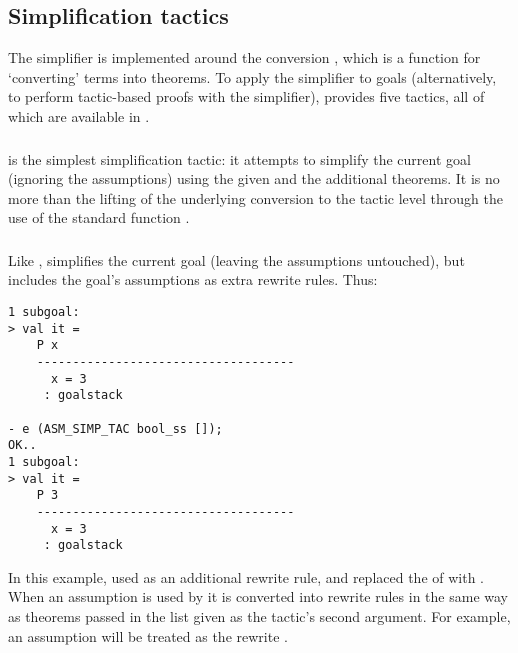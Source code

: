 \subsection{Simplification tactics}
\label{sec:simplification-tactics}

The simplifier is implemented around the conversion ,
which is a function for `converting' terms into theorems.  To apply
the simplifier to goals (alternatively, to perform tactic-based proofs
with the simplifier), \HOL{} provides five tactics, all of which are
available in .

\subsubsection{}

 is the simplest simplification tactic: it attempts to
simplify the current goal (ignoring the assumptions) using the given
\simpset{} and the additional theorems.  It is no more than the
lifting of the underlying  conversion to the tactic
level through the use of the standard function .

\subsubsection{}

Like ,  simplifies the current goal
(leaving the assumptions untouched), but includes the goal's
assumptions as extra rewrite rules.  Thus:
\begin{session}
\begin{verbatim}
1 subgoal:
> val it =
    P x
    ------------------------------------
      x = 3
     : goalstack

- e (ASM_SIMP_TAC bool_ss []);
OK..
1 subgoal:
> val it =
    P 3
    ------------------------------------
      x = 3
     : goalstack
\end{verbatim}
\end{session}
\noindent
In this example,  used  as an
additional rewrite rule, and replaced the  of 
with .  When an assumption is used by  it
is converted into rewrite rules in the same way as theorems passed in
the list given as the tactic's second argument.  For example, an
assumption  will be treated as the rewrite .


